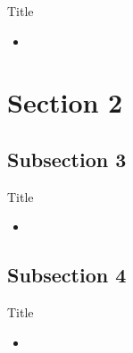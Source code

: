 \documentclass{beamer}
\begin{document}
\begin{frame}{Title}
    \begin{itemize}
        \item
    \end{itemize}
\end{frame}


\section{Section 2}

\subsection{Subsection 3}

\begin{frame}{Title}
    \begin{itemize}
        \item
    \end{itemize}
\end{frame}

\subsection{Subsection 4}

\begin{frame}{Title}
    \begin{itemize}
        \item
    \end{itemize}
\end{frame}
\end{document}
